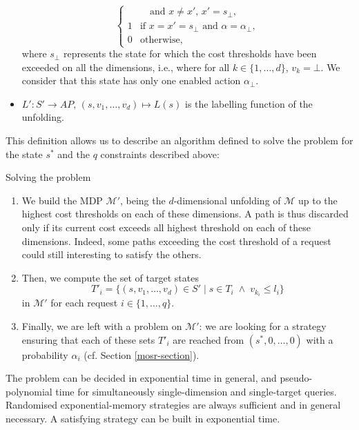 \begin{definition}
\begin{itemize}
\[\begin{cases}
      & \quad \text{and } x \neq x', \, x' = s_\bot,\\
      1 & \text{if } x=x'=s_\bot \text{ and } \alpha = \alpha_\bot, \\
      0 & \text{otherwise,}
    \end{cases}
    \]
    where $s_\bot$ represents the state for which the cost thresholds have been exceeded on all the dimensions, i.e., where for all $k \in \{1, \dots, d\}$, $v_k = \bot$. We consider that this state has only one enabled action $\alpha_\bot$.
    \item $L': S' \rightarrow AP,\, (s, v_1, \dots, v_d) \mapsto L(s)$ is the labelling function of the unfolding.
  \end{itemize}
\end{definition}

This definition allows us to describe an algorithm defined to solve the \SSPPQ{} problem for the state $s^*$ and the $q$ constraints described above:

\begin{algorithm}
\caption{Solving the \SSPPQ{} problem}\label{ssppq-algo}
\begin{enumerate}
\item We build the MDP $\mathcal{M}'$, being the $d$-dimensional unfolding of $\mathcal{M}$ up to the highest cost thresholds on each of these dimensions.
  A path is thus discarded only if its current cost exceeds all highest threshold on each of these dimensions.
  Indeed, some paths exceeding the cost threshold of a request could still interesting to satisfy the others.
  \item Then, we compute the set of target states \[T'_i = \{ (s, v_1, \dots, v_d) \in S' \; | \; s \in T_i  \; \wedge \; v_{k_i} \leq l_i \}\] in $\mathcal{M}'$ for each request $i \in \{1, \dots, q\}$.
  \item Finally, we are left with a \MOSR{} problem on $\mathcal{M}'$: we are looking for a strategy ensuring that each of these sets $T'_i$ are reached from $(s^*, 0, \dots, 0)$ with a probability $\alpha_i$ (cf. Section \ref{mosr-section}).
\end{enumerate}
\end{algorithm}

\begin{theorem}
  The \SSPPQ{} problem can be decided in exponential time in general, and pseudo-polynomial time for simultaneously single-dimension and single-target queries.
  Randomised exponential-memory strategies are always sufficient and in general necessary.
  A satisfying strategy can be built in exponential time.
\end{theorem}


